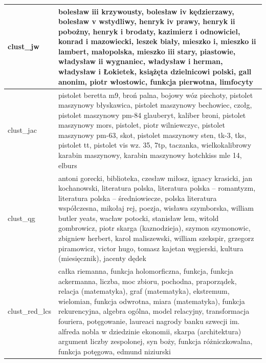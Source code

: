 \documentclass{praca1}
\begin{document}
\begin{longtable}{|L{0.5cm}|L{15cm}|}
   \hline
\begin{sideways}clust\_jw\end{sideways} & bolesław iii krzywousty, bolesław iv kędzierzawy, bolesław v wstydliwy, henryk iv prawy, henryk ii pobożny, henryk i brodaty, kazimierz i odnowiciel, konrad i mazowiecki, leszek biały, mieszko i, mieszko ii lambert, małopolska, mieszko iii stary, piastowie, władysław ii wygnaniec, władysław i herman, władysław i Łokietek, książęta dzielnicowi polski, gall anonim, piotr włostowic, funkcja pierwotna, limfocyty \\ %
   \hline
\begin{sideways}clust\_jac\end{sideways} & pistolet beretta m9, broń palna, bojowy wóz piechoty, pistolet maszynowy błyskawica, pistolet maszynowy bechowiec, czołg, pistolet maszynowy pm-84 glauberyt, kaliber broni, pistolet maszynowy mors, pistolet, piotr wilniewczyc, pistolet maszynowy pm-63, skot, pistolet maszynowy sten, tk-3, tks, pistolet tt, pistolet vis wz. 35, 7tp, taczanka, wielkokalibrowy karabin maszynowy, karabin maszynowy hotchkiss mle 14, elburs \\ %
   \hline
\begin{sideways}clust\_qg\end{sideways} & antoni gorecki, biblioteka, czesław miłosz, ignacy krasicki, jan kochanowski, literatura polska, literatura polska – romantyzm, literatura polska – średniowiecze, polska literatura współczesna, mikołaj rej, poezja, wisława szymborska, william butler yeats, wacław potocki, stanisław lem, witold gombrowicz, piotr skarga (kaznodzieja), szymon szymonowic, zbigniew herbert, karol maliszewski, william szekspir, grzegorz piramowicz, victor hugo, tomasz kajetan węgierski, kultura (miesięcznik), jacenty dędek \\ %
   \hline
\begin{sideways}clust\_red\_lcs\end{sideways} & całka riemanna, funkcja holomorficzna, funkcja, funkcja ackermanna, liczba, moc zbioru, pochodna, praporządek, relacja (matematyka), graf (matematyka), ekstremum, wielomian, funkcja odwrotna, miara (matematyka), funkcja rekurencyjna, algebra ogólna, model relacyjny, transformacja fouriera, potęgowanie, laureaci nagrody banku szwecji im. alfreda nobla w dziedzinie ekonomii, skarpa (architektura) argument liczby zespolonej, syn boży, funkcja różniczkowalna, funkcja potęgowa, edmund niziurski \\ %

\end{longtable}
\end{document}

